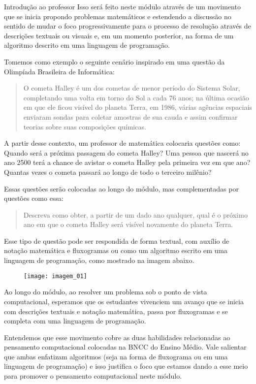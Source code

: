 \begin{apresentacao}{Introdução ao professor}
Isso será feito neste módulo através de um movimento que se inicia propondo problemas matemáticos e estendendo a discussão no sentido de mudar o foco progressivamente para o processo de resolução através de descrições textuais ou visuais e, em um momento posterior, na forma de um algoritmo descrito em uma linguagem de programação.

Tomemos como exemplo o seguinte cenário inspirado em uma questão da Olimpíada Brasileira de Informática:

\begin{quote}
O cometa Halley é um dos cometas de menor período do Sistema Solar, completando uma volta em torno do Sol a cada 76 anos; na última ocasião em que ele ficou visível do planeta Terra, em 1986, várias agências espaciais enviaram sondas para coletar amostras de sua cauda e assim confirmar teorias sobre suas composições químicas.
\end{quote}

A partir desse contexto, um professor de matemática colocaria questões como: Quando será a próxima passagem do cometa Halley? Uma pessoa que nascerá no ano 2500 terá a chance de avistar o cometa Halley pela primeira vez em que ano? Quantas vezes o cometa passará ao longo de todo o terceiro milênio?

Essas questões serão colocadas ao longo do módulo, mas complementadas por questões como essa:

\begin{quote}
Descreva como obter, a partir de um dado ano qualquer, qual é o próximo ano em que o cometa Halley será visível novamente do planeta Terra.
\end{quote}

Esse tipo de questão pode ser respondida de forma textual, com auxílio de notação matemática e fluxogramas ou como um algoritmo escrito em uma linguagem de programação, como mostrado na imagem abaixo.

\begin{figure}[H]
\centering

\texttt{[image: imagem\_01]}
\end{figure}

Ao longo do módulo, ao resolver um problema sob o ponto de vista computacional, esperamos que os estudantes vivenciem um avanço que se inicia com descrições textuais e notação matemática, passa por fluxogramas e se completa com uma linguagem de programação.

Entendemos que esse movimento cobre as duas habilidades relacionadas ao pensamento computacional colocadas na BNCC do Ensino Médio. Vale salientar que ambas enfatizam algoritmos (seja na forma de fluxograma ou em uma linguagem de programação) e isso justifica o foco que estamos dando a esse meio para promover o pensamento computacional neste módulo.


\end{apresentacao}
